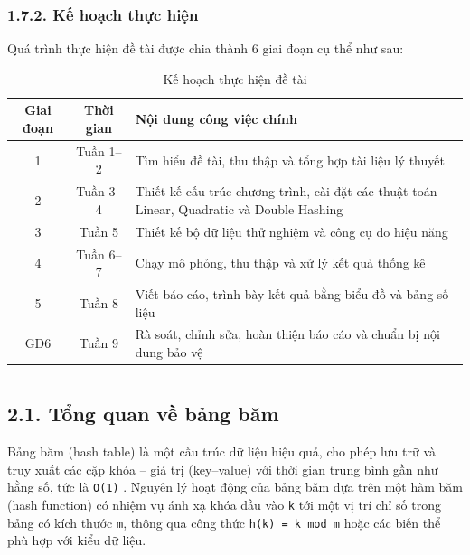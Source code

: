 \documentclass[12pt,a4paper]{report}
\begin{document}
\subsection*{1.7.2. Kế hoạch thực hiện}
\noindent \indent Quá trình thực hiện đề tài được chia thành 6 giai đoạn cụ thể như sau:
\begin{table}[H]
\centering
\renewcommand{\arraystretch}{1.3}
\begin{tabular}{|c|c|p{9cm}|}
\hline
\textbf{Giai đoạn} & \textbf{Thời gian} & \textbf{Nội dung công việc chính} \\
\hline
1 & Tuần 1–2 & Tìm hiểu đề tài, thu thập và tổng hợp tài liệu lý thuyết \\
\hline
2 & Tuần 3–4 & Thiết kế cấu trúc chương trình, cài đặt các thuật toán Linear, Quadratic và Double Hashing \\
\hline
3 & Tuần 5 & Thiết kế bộ dữ liệu thử nghiệm và công cụ đo hiệu năng \\
\hline
4 & Tuần 6–7 & Chạy mô phỏng, thu thập và xử lý kết quả thống kê \\
\hline
5 & Tuần 8 & Viết báo cáo, trình bày kết quả bằng biểu đồ và bảng số liệu \\
\hline
GĐ6 & Tuần 9 & Rà soát, chỉnh sửa, hoàn thiện báo cáo và chuẩn bị nội dung bảo vệ \\
\hline
\end{tabular}
\caption{Kế hoạch thực hiện đề tài}
\end{table}

\newpage
\chapter*{}

\section*{2.1. Tổng quan về bảng băm}
\noindent \indent Bảng băm (hash table) là một cấu trúc dữ liệu hiệu quả, cho phép lưu trữ và truy xuất các cặp khóa – giá trị (key–value) với thời gian trung bình gần như hằng số, tức là \texttt{O(1)} \cite{cormen2009}. Nguyên lý hoạt động của bảng băm dựa trên một hàm băm (hash function) có nhiệm vụ ánh xạ khóa đầu vào \texttt{k} tới một vị trí chỉ số trong bảng có kích thước \texttt{m}, thông qua công thức \texttt{h(k) = k mod m} hoặc các biến thể phù hợp với kiểu dữ liệu.
\end{document}
